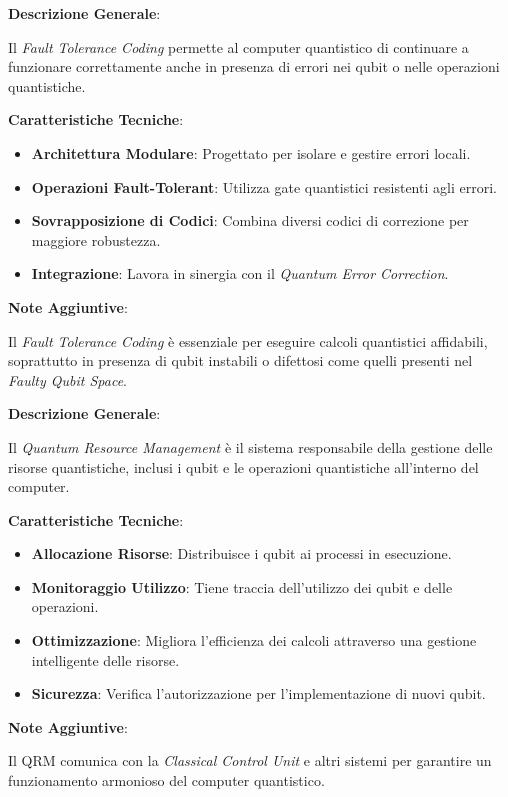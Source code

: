 \begin{tcolorbox}[colback=white,colframe=black,title=\textbf{Fault Tolerance Coding}]
\begin{multicols}{2}
\textbf{Descrizione Generale}:

Il \emph{Fault Tolerance Coding} permette al computer quantistico di continuare a funzionare correttamente anche in presenza di errori nei qubit o nelle operazioni quantistiche.

\textbf{Caratteristiche Tecniche}:
\begin{itemize}
    \item \textbf{Architettura Modulare}: Progettato per isolare e gestire errori locali.
    \item \textbf{Operazioni Fault-Tolerant}: Utilizza gate quantistici resistenti agli errori.
    \item \textbf{Sovrapposizione di Codici}: Combina diversi codici di correzione per maggiore robustezza.
    \item \textbf{Integrazione}: Lavora in sinergia con il \emph{Quantum Error Correction}.
\end{itemize}

\textbf{Note Aggiuntive}:

Il \emph{Fault Tolerance Coding} è essenziale per eseguire calcoli quantistici affidabili, soprattutto in presenza di qubit instabili o difettosi come quelli presenti nel \emph{Faulty Qubit Space}.

\end{multicols}
\end{tcolorbox}

\vspace{0.5cm}

\begin{tcolorbox}[colback=white,colframe=black,title=\textbf{Quantum Resource Management (QRM)}]
\begin{multicols}{2}
\textbf{Descrizione Generale}:

Il \emph{Quantum Resource Management} è il sistema responsabile della gestione delle risorse quantistiche, inclusi i qubit e le operazioni quantistiche all'interno del computer.

\textbf{Caratteristiche Tecniche}:
\begin{itemize}
    \item \textbf{Allocazione Risorse}: Distribuisce i qubit ai processi in esecuzione.
    \item \textbf{Monitoraggio Utilizzo}: Tiene traccia dell'utilizzo dei qubit e delle operazioni.
    \item \textbf{Ottimizzazione}: Migliora l'efficienza dei calcoli attraverso una gestione intelligente delle risorse.
    \item \textbf{Sicurezza}: Verifica l'autorizzazione per l'implementazione di nuovi qubit.
\end{itemize}

\textbf{Note Aggiuntive}:

Il QRM comunica con la \emph{Classical Control Unit} e altri sistemi per garantire un funzionamento armonioso del computer quantistico.

\end{multicols}
\end{tcolorbox}

